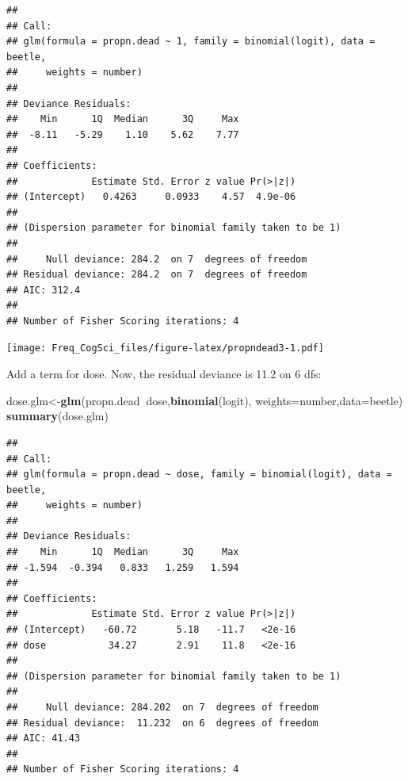 \documentclass[12pt,]{krantz}
\newenvironment{Shaded}{\begin{snugshade}}{\end{snugshade}}
\newcommand{\DataTypeTok}[1]{\textcolor[rgb]{0.13,0.29,0.53}{#1}}
\newcommand{\DecValTok}[1]{\textcolor[rgb]{0.00,0.00,0.81}{#1}}
\newcommand{\KeywordTok}[1]{\textcolor[rgb]{0.13,0.29,0.53}{\textbf{#1}}}
\newcommand{\NormalTok}[1]{#1}
\newcommand{\OperatorTok}[1]{\textcolor[rgb]{0.81,0.36,0.00}{\textbf{#1}}}
\newcommand{\StringTok}[1]{\textcolor[rgb]{0.31,0.60,0.02}{#1}}
\begin{document}
\begin{verbatim}
## 
## Call:
## glm(formula = propn.dead ~ 1, family = binomial(logit), data = beetle, 
##     weights = number)
## 
## Deviance Residuals: 
##    Min      1Q  Median      3Q     Max  
##  -8.11   -5.29    1.10    5.62    7.77  
## 
## Coefficients:
##             Estimate Std. Error z value Pr(>|z|)
## (Intercept)   0.4263     0.0933    4.57  4.9e-06
## 
## (Dispersion parameter for binomial family taken to be 1)
## 
##     Null deviance: 284.2  on 7  degrees of freedom
## Residual deviance: 284.2  on 7  degrees of freedom
## AIC: 312.4
## 
## Number of Fisher Scoring iterations: 4
\end{verbatim}

\begin{Shaded}
\end{Shaded}

\texttt{[image: Freq\_CogSci\_files/figure-latex/propndead3-1.pdf]}

Add a term for dose. Now, the residual deviance is 11.2 on 6 dfs:

\begin{Shaded}
\begin{Highlighting}[]
\NormalTok{dose.glm<-}\KeywordTok{glm}\NormalTok{(propn.dead}\OperatorTok{~}\NormalTok{dose,}\KeywordTok{binomial}\NormalTok{(logit),}
          \DataTypeTok{weights=}\NormalTok{number,}\DataTypeTok{data=}\NormalTok{beetle)}
\KeywordTok{summary}\NormalTok{(dose.glm)}
\end{Highlighting}
\end{Shaded}

\begin{verbatim}
## 
## Call:
## glm(formula = propn.dead ~ dose, family = binomial(logit), data = beetle, 
##     weights = number)
## 
## Deviance Residuals: 
##    Min      1Q  Median      3Q     Max  
## -1.594  -0.394   0.833   1.259   1.594  
## 
## Coefficients:
##             Estimate Std. Error z value Pr(>|z|)
## (Intercept)   -60.72       5.18   -11.7   <2e-16
## dose           34.27       2.91    11.8   <2e-16
## 
## (Dispersion parameter for binomial family taken to be 1)
## 
##     Null deviance: 284.202  on 7  degrees of freedom
## Residual deviance:  11.232  on 6  degrees of freedom
## AIC: 41.43
## 
## Number of Fisher Scoring iterations: 4
\end{verbatim}
\end{document}
